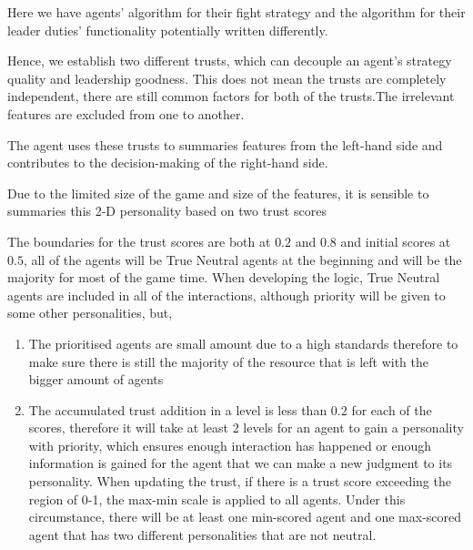 Here we have agents' algorithm for their fight strategy and the algorithm for their leader duties' functionality potentially written differently.

Hence, we establish two different trusts, which can decouple an agent's strategy quality and leadership goodness. This does not mean the trusts are completely independent, there are still common factors for both of the trusts.The irrelevant features are excluded from one to another.

The agent uses these trusts to summaries features from the left-hand side and contributes to the decision-making of the right-hand side.

Due to the limited size of the game and size of the features, it is sensible to summaries this 2-D personality based on two trust scores

The boundaries for the trust scores are both at $0.2$ and $0.8$ and initial scores at $0.5$, all of the agents will be True Neutral agents at the beginning and will be the majority for most of the game time. When developing the logic, True Neutral agents are included in all of the interactions, although priority will be given to some other personalities, but,
\begin{enumerate}
    \item The prioritised agents are small amount due to a high standards therefore to make sure there is still the majority of the resource that is left with the bigger amount of agents
    \item The accumulated trust addition in a level is less than $0.2$ for each of the scores, therefore it will take at least 2 levels for an agent to gain a personality with priority, which ensures enough interaction has happened or enough information is gained for the agent that we can make a new judgment to its personality. When updating the trust, if there is a trust score exceeding the region of 0-1, the max-min scale is applied to all agents. Under this circumstance, there will be at least one min-scored agent and one max-scored agent that has two different personalities that are not neutral.
\end{enumerate}

\newpage

